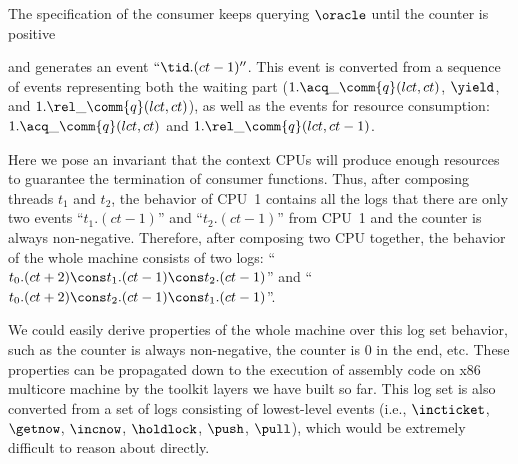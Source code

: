 {The specification of the consumer keeps 
querying $\oracle$ until the counter is positive
and generates an
event $``\tid.(ct-1)''$.
This event is converted from
a sequence of events representing both the waiting part
($1.\acq\_\comm{q}(lct, ct)$, $\yield$, and $1.\rel\_\comm{q}(lct, ct)$),
as well as the events for resource consumption:
$1.\acq\_\comm{q}(lct, ct)$ and $1.\rel\_\comm{q}(lct, ct - 1)$.
%
Here we pose an invariant that the context CPUs will produce enough resources
to guarantee the termination of consumer functions.
Thus, after composing threads $t_1$ and $t_2$,
the behavior of CPU~1 contains all the logs
that there are only two events ``$t_1.(ct -1)$''
and ``$t_2.(ct -1)$'' from CPU~1 and the counter is always non-negative.
Therefore, after composing two CPU together,
the behavior of the whole machine
consists of two logs: ``$t_0.(ct +2)\cons t_1.(ct -1) \cons t_2.(ct -1)$'' and ``$t_0.(ct +2)\cons t_2.(ct -1) \cons t_1.(ct-1)$''.

We could easily derive properties of the whole
machine over this log set behavior,
such as the counter is always non-negative, the counter is 0 in the end, etc.
These properties can be propagated down to the
execution of assembly code on x86 multicore machine 
by the toolkit layers we have built so far.
This log set is also converted from a set of logs consisting
of lowest-level events  (i.e., $\incticket$,
$\getnow$, $\incnow$, $\holdlock$, $\push$, $\pull$),
which would be extremely difficult to reason about directly.}


